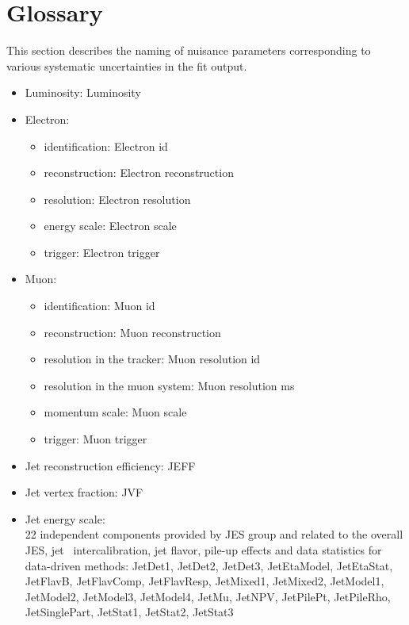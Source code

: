 \chapter{Glossary}
\label{app:glossary}

This section describes the naming of nuisance parameters corresponding to
various systematic uncertainties in the fit output. 

\begin{itemize}

\item Luminosity: Luminosity

\item Electron: 
 \begin{itemize}
 \item identification: Electron id
 \item reconstruction: Electron reconstruction
 \item resolution: Electron resolution
 \item energy scale: Electron scale
 \item trigger: Electron trigger
\end{itemize}

\item Muon: 
 \begin{itemize}
 \item identification: Muon id
 \item reconstruction: Muon reconstruction
 \item resolution in the tracker: Muon resolution id
 \item resolution in the muon system: Muon resolution ms
 \item momentum scale: Muon scale
 \item trigger: Muon trigger
\end{itemize}

\item Jet reconstruction efficiency: JEFF

\item Jet vertex fraction: JVF

\item Jet energy scale: \\
22 independent components provided by JES group and related to the overall JES, jet \eta\ 
intercalibration, jet flavor, pile-up effects and data statistics for data-driven methods: 
JetDet1, JetDet2, JetDet3, JetEtaModel, JetEtaStat, JetFlavB, JetFlavComp, JetFlavResp, 
JetMixed1, JetMixed2, JetModel1, JetModel2, JetModel3, JetModel4, JetMu, JetNPV, JetPilePt, 
JetPileRho, JetSinglePart, JetStat1, JetStat2, JetStat3 


\end{itemize}
